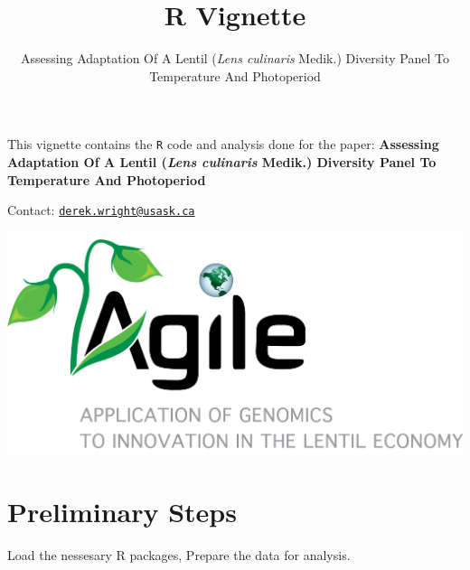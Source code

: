 \documentclass[
]{article}
\title{R Vignette}
\subtitle{Assessing Adaptation Of A Lentil (\emph{Lens culinaris} Medik.)
Diversity Panel To Temperature And Photoperiod}
\author{}
\date{\vspace{-2.5em}}
\begin{document}
\maketitle

{
\setcounter{tocdepth}{2}
\tableofcontents
}
This vignette contains the \texttt{R} code and analysis done for the
paper: \textbf{Assessing Adaptation Of A Lentil (\emph{Lens culinaris}
Medik.) Diversity Panel To Temperature And Photoperiod}

Contact:
\href{mailto:derek.wright@usask.ca}{\nolinkurl{derek.wright@usask.ca}}

\includegraphics{www/Logo_Agile.png}

\hypertarget{preliminary-steps}{%
\section{Preliminary Steps}\label{preliminary-steps}}

Load the nessesary R packages, Prepare the data for analysis.
\end{document}
